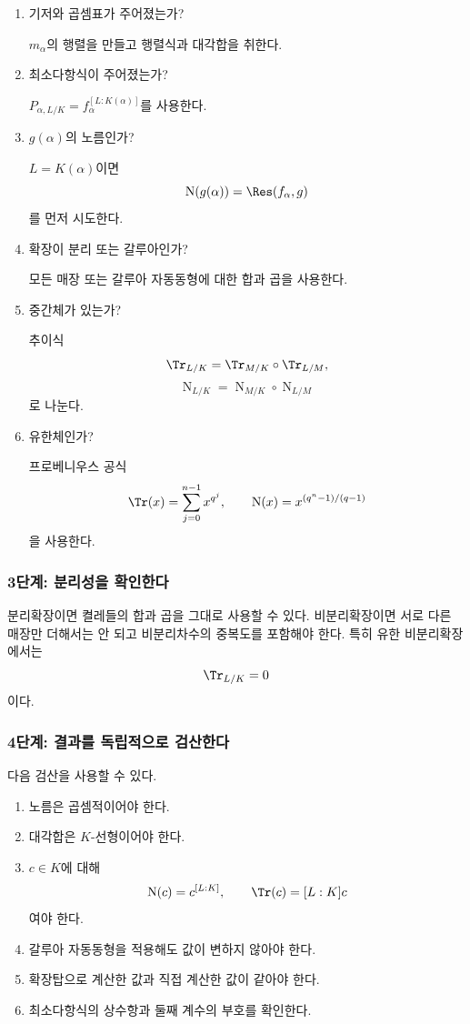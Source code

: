 \begin{enumerate}[label=(\alph*)]
  \item 기저와 곱셈표가 주어졌는가?
  
  $m_\alpha$의 행렬을 만들고 행렬식과 대각합을 취한다.

  \item 최소다항식이 주어졌는가?
  
  $P_{\alpha,L/K}=f_\alpha^{[L:K(\alpha)]}$를 사용한다.

  \item $g(\alpha)$의 노름인가?
  
  $L=K(\alpha)$이면
  \[
    \operatorname N(g(\alpha))=\Res(f_\alpha,g)
  \]
  를 먼저 시도한다.

  \item 확장이 분리 또는 갈루아인가?
  
  모든 매장 또는 갈루아 자동동형에 대한 합과 곱을 사용한다.

  \item 중간체가 있는가?
  
  추이식
  \[
    \Tr_{L/K}=\Tr_{M/K}\circ\Tr_{L/M},
  \]
  \[
    \operatorname N_{L/K}
    =\operatorname N_{M/K}\circ\operatorname N_{L/M}
  \]
  로 나눈다.

  \item 유한체인가?
  
  프로베니우스 공식
  \[
    \Tr(x)=\sum_{j=0}^{n-1}x^{q^j},
    \qquad
    \operatorname N(x)=x^{(q^n-1)/(q-1)}
  \]
  을 사용한다.
\end{enumerate}

\subsubsection*{3단계: 분리성을 확인한다}

분리확장이면 켤레들의 합과 곱을 그대로 사용할 수 있다. 비분리확장이면 서로 다른 매장만 더해서는 안 되고 비분리차수의 중복도를 포함해야 한다. 특히 유한 비분리확장에서는
\[
  \Tr_{L/K}=0
\]
이다.

\subsubsection*{4단계: 결과를 독립적으로 검산한다}

다음 검산을 사용할 수 있다.

\begin{enumerate}[label=(\roman*)]
  \item 노름은 곱셈적이어야 한다.
  \item 대각합은 $K$-선형이어야 한다.
  \item $c\in K$에 대해
  \[
    \operatorname N(c)=c^{[L:K]},
    \qquad
    \Tr(c)=[L:K]c
  \]
  여야 한다.
  \item 갈루아 자동동형을 적용해도 값이 변하지 않아야 한다.
  \item 확장탑으로 계산한 값과 직접 계산한 값이 같아야 한다.
  \item 최소다항식의 상수항과 둘째 계수의 부호를 확인한다.
\end{enumerate}

